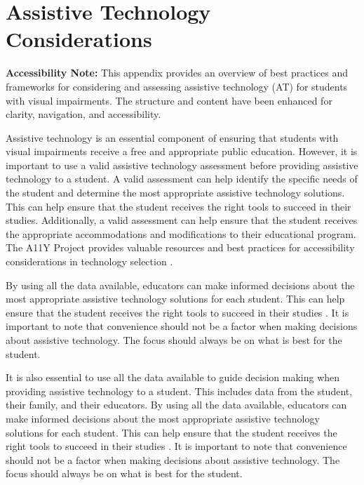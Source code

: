 \chapter{Assistive Technology Considerations}\label{app3:trouble3}

\noindent
\textbf{Accessibility Note:} This appendix provides an overview of best practices and frameworks for considering and assessing assistive technology (AT) for students with visual impairments. The structure and content have been enhanced for clarity, navigation, and accessibility.

Assistive technology is an essential component of ensuring that students with visual impairments receive a free and appropriate public education. However, it is important to use a valid assistive technology assessment before providing assistive technology to a student. A valid assessment can help identify the specific needs of the student and determine the most appropriate assistive technology solutions. This can help ensure that the student receives the right tools to succeed in their studies. Additionally, a valid assessment can help ensure that the student receives the appropriate accommodations and modifications to their educational program. The A11Y Project provides valuable resources and best practices for accessibility considerations in technology selection \supercite{A11yProject}.

By using all the data available, educators can make informed decisions about the most appropriate assistive technology solutions for each student. This can help ensure that the student receives the right tools to succeed in their studies  \supercite{AEMCenter}. It is important to note that convenience should not be a factor when making decisions about assistive technology. The focus should always be on what is best for the student.

It is also essential to use all the data available to guide decision making when providing assistive technology to a student. This includes data from the student, their family, and their educators. By using all the data available, educators can make informed decisions about the most appropriate assistive technology solutions for each student. This can help ensure that the student receives the right tools to succeed in their studies \supercite{AEMCenter}. It is important to note that convenience should not be a factor when making decisions about assistive technology. The focus should always be on what is best for the student.

